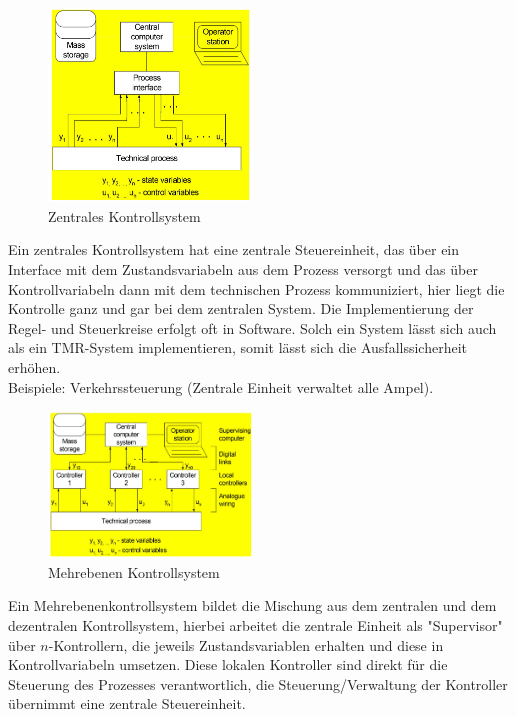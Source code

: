 \documentclass[12pt,a4paper,ngerman]{article}
\begin{document}
\pagebreak

\begin{figure}[h!]
\vspace{-20pt}
  \begin{center}
    \includegraphics[width=0.48\textwidth]{figures/zentral.pdf}
  \end{center}
  \caption{Zentrales Kontrollsystem}
\vspace{-10pt}
\end{figure}
Ein zentrales Kontrollsystem hat eine zentrale Steuereinheit, das über ein Interface mit dem Zustandsvariabeln aus dem Prozess versorgt und das über Kontrollvariabeln dann mit dem technischen Prozess kommuniziert, hier liegt die Kontrolle ganz und gar bei dem zentralen System. Die Implementierung der Regel- und Steuerkreise erfolgt oft in Software. Solch ein System lässt sich auch als ein TMR-System implementieren, somit lässt sich die Ausfallssicherheit erhöhen.\\
Beispiele: Verkehrssteuerung (Zentrale Einheit verwaltet alle Ampel).  
\begin{figure}[h!]
  \begin{center}
    \includegraphics[width=0.48\textwidth]{figures/mehrebenen.pdf}
  \end{center}
  \caption{Mehrebenen Kontrollsystem}
\vspace{-10pt}
\end{figure}
Ein Mehrebenenkontrollsystem bildet die Mischung aus dem zentralen und dem dezentralen Kontrollsystem, hierbei arbeitet die zentrale Einheit als "Supervisor" über $n$-Kontrollern, die jeweils Zustandsvariablen erhalten und diese in Kontrollvariabeln umsetzen. Diese lokalen Kontroller sind direkt für die Steuerung des Prozesses verantwortlich, die Steuerung/Verwaltung der Kontroller übernimmt eine zentrale Steuereinheit. \\
\end{document}
